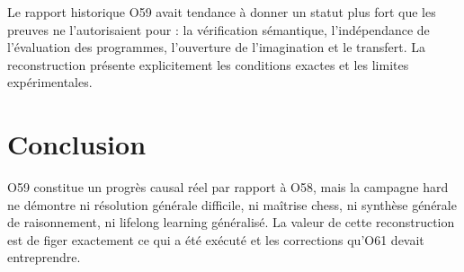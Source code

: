 \documentclass[11pt,a4paper]{article}
\begin{document}
Le rapport historique O59 avait tendance à donner un statut plus fort que les preuves ne l'autorisaient pour : la vérification sémantique, l'indépendance de l'évaluation des programmes, l'ouverture de l'imagination et le transfert. La reconstruction présente explicitement les conditions exactes et les limites expérimentales.\section{Conclusion}
O59 constitue un progrès causal réel par rapport à O58, mais la campagne hard ne démontre ni résolution générale difficile, ni maîtrise chess, ni synthèse générale de raisonnement, ni lifelong learning généralisé. La valeur de cette reconstruction est de figer exactement ce qui a été exécuté et les corrections qu'O61 devait entreprendre.
\end{document}
